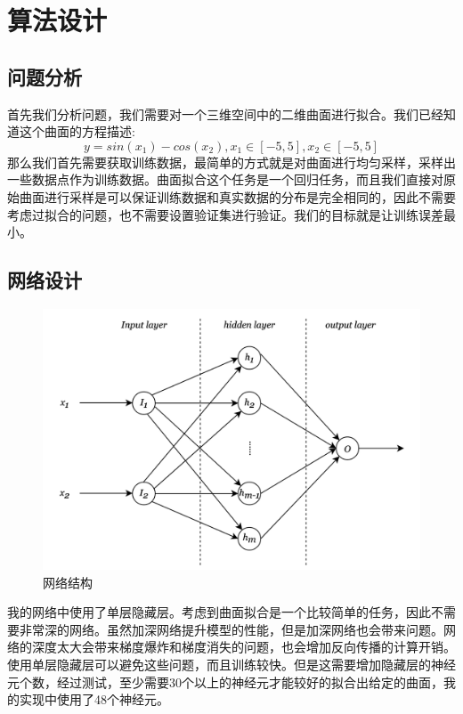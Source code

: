 \documentclass[UTF8]{ctexart}
\begin{document}
\section{算法设计}
\subsection{问题分析}
首先我们分析问题，我们需要对一个三维空间中的二维曲面进行拟合。我们已经知道这个曲面的方程描述:
\begin{equation*}
    y = sin(x_1) - cos(x_2), x_1\in [-5,5], x_2\in [-5, 5]
\end{equation*}
那么我们首先需要获取训练数据，最简单的方式就是对曲面进行均匀采样，采样出一些数据点作为训练数据。曲面拟合这个任务是一个回归任务，而且我们直接对原始曲面进行采样是可以保证训练数据和真实数据的分布是完全相同的，因此不需要考虑过拟合的问题，也不需要设置验证集进行验证。我们的目标就是让训练误差最小。

\subsection{网络设计}
\begin{figure}[htbp]
    \centering
    \includegraphics[width=5in]{figures/nn.png}
    \centering
    \caption{网络结构}
\end{figure}

我的网络中使用了单层隐藏层。考虑到曲面拟合是一个比较简单的任务，因此不需要非常深的网络。虽然加深网络提升模型的性能，但是加深网络也会带来问题。网络的深度太大会带来梯度爆炸和梯度消失的问题，也会增加反向传播的计算开销。使用单层隐藏层可以避免这些问题，而且训练较快。但是这需要增加隐藏层的神经元个数，经过测试，至少需要30个以上的神经元才能较好的拟合出给定的曲面，我的实现中使用了48个神经元。
\end{document}
